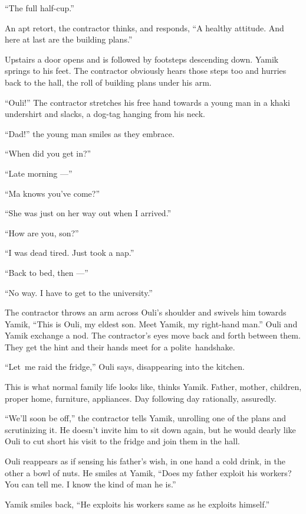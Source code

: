 \documentclass[twoside,11pt,openany]{book}
\begin{document}
``The full half-cup.''

An apt retort, the contractor thinks, and responds, ``A healthy attitude. And here at last are the
building plans.''

Upstairs a door opens and is followed by footsteps descending down. Yamik springs to his feet. The contractor obviously
hears those steps too and hurries back to the hall, the roll of building plans under his arm.

``Ouli!''  The contractor stretches his free hand towards a young man in a khaki undershirt
and slacks,{ }a dog-tag hanging from his neck.

``Dad!'' the young man smiles as they embrace.

``When did you get in?''

``Late morning ---''

``Ma knows you've come?''

``She was just on her way out when I arrived.''

``How are you, son?''

``I was dead tired. Just took a nap.''

``Back to bed, then ---''

``No way. I have to get to the university.''

The contractor throws an arm across Ouli's shoulder and swivels him towards Yamik, ``This is Ouli, my
eldest son. Meet Yamik, my right-hand man.'' Ouli and Yamik exchange a nod. The contractor's eyes move
back and forth between them. They get the hint and their hands meet for a polite~handshake.

``Let~me raid the fridge,'' Ouli says, disappearing into the kitchen.

This is what normal family life looks like, thinks Yamik. Father, mother, children, proper home, furniture, appliances.
Day following day rationally, assuredly.

``We'll soon be off,'' the contractor tells Yamik, unrolling one of the plans and scrutinizing
it. He doesn't invite him to sit down again, but he would dearly like Ouli to cut short his visit to the fridge and
join them in the hall.

Ouli reappears as if sensing his father's wish, in one hand a cold drink, in the other a bowl of nuts. He smiles at
Yamik, ``Does my father exploit his workers? You can tell me. I know the kind of man he
is.''

Yamik smiles back, ``He exploits his workers same as he exploits himself.''
\end{document}
